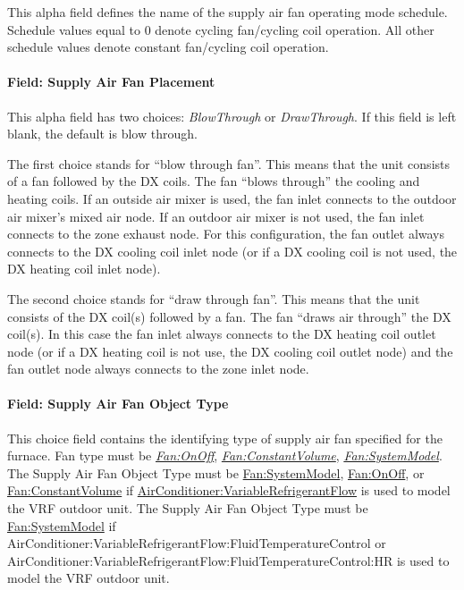 This alpha field defines the name of the supply air fan operating mode schedule. Schedule values equal to 0 denote cycling fan/cycling coil operation. All other schedule values denote constant fan/cycling coil operation.

\paragraph{Field: Supply Air Fan Placement}\label{field-supply-air-fan-placement-000}

This alpha field has two choices: \textit{BlowThrough} or \textit{DrawThrough}. If this field is left blank, the default is blow through.

The first choice stands for ``blow through fan''. This means that the unit consists of a fan followed by the DX coils. The fan ``blows through'' the cooling and heating coils. If an outside air mixer is used, the fan inlet connects to the outdoor air mixer's mixed air node. If an outdoor air mixer is not used, the fan inlet connects to the zone exhaust node. For this configuration, the fan outlet always connects to the DX cooling coil inlet node (or if a DX cooling coil is not used, the DX heating coil inlet node).

The second choice stands for ``draw through fan''. This means that the unit consists of the DX coil(s) followed by a fan. The fan ``draws air through'' the DX coil(s). In this case the fan inlet always connects to the DX heating coil outlet node (or if a DX heating coil is not use, the DX cooling coil outlet node) and the fan outlet node always connects to the zone inlet node.

\paragraph{Field: Supply Air Fan Object Type}\label{field-supply-air-fan-object-type-8}

This choice field contains the identifying type of supply air fan specified for the furnace. Fan type must be \textit{\hyperref[fanonoff]{Fan:OnOff}}, \textit{\hyperref[fanconstantvolume]{Fan:ConstantVolume}}, \textit{\hyperref[fansystemmodel]{Fan:SystemModel}}. The Supply Air Fan Object Type must be \hyperref[fansystemmodel]{Fan:SystemModel}, \hyperref[fanonoff]{Fan:OnOff}, or \hyperref[fanconstantvolume]{Fan:ConstantVolume} if \hyperref[airconditionervariablerefrigerantflow]{AirConditioner:VariableRefrigerantFlow} is used to model the VRF outdoor unit. The Supply Air Fan Object Type must be \hyperref[fansystemmodel]{Fan:SystemModel} if AirConditioner:VariableRefrigerantFlow:\-FluidTemperatureControl or AirConditioner:VariableRefrigerantFlow:\-FluidTemperatureControl:HR is used to model the VRF outdoor unit.

